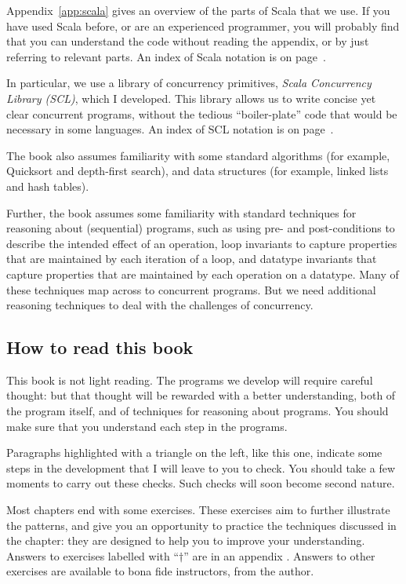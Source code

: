Appendix~\ref{app:scala} gives an overview of the parts of Scala that we use.
If you have used Scala before, or are an experienced programmer, you will
probably find that you can understand the code without reading the appendix,
or by just referring to relevant parts.  An index of Scala notation is on
page~\pageref{scala-index}.

In particular, we  use a library of concurrency primitives, \emph{Scala
  Concurrency Library (SCL)}, which I developed.  This library
allows us to write concise yet clear concurrent programs, without the tedious
``boiler-plate'' code that would be necessary in some languages.
   An index of SCL notation is on
page~\pageref{SCL-index}.

The book also assumes familiarity with some standard algorithms (for example,
Quicksort and depth-first search), and data structures (for example, linked
lists and hash tables).

Further, the book assumes some familiarity with standard techniques for
reasoning about (sequential) programs, such as using pre- and post-conditions
to describe the intended effect of an operation, loop invariants to capture
properties that are maintained by each iteration of a loop, and datatype
invariants that capture properties that are maintained by each operation on a
datatype.  Many of these techniques map across to concurrent programs.  But we
need additional reasoning techniques to deal with the challenges of
concurrency.



\subsection*{How to read this book}

This book is not light reading.  The programs we develop will require careful
thought: but that thought will be rewarded with a better understanding, both
of the program itself, and of techniques for reasoning about programs.  You
should make sure that you understand each step in the programs.
%
\begin{instruction}
Paragraphs highlighted with a triangle on the left, like this one, indicate
some steps in the development that I will leave to you to check.  You should
take a few moments to carry out these checks.  Such checks will soon become
second nature.   
\end{instruction}

Most chapters end with some exercises.  These exercises aim to further
illustrate the patterns, and give you an opportunity to practice the
techniques discussed in the chapter: they are designed to help you to improve
your understanding.  Answers to exercises labelled with ``$\dag$'' are in an
appendix .  Answers to other exercises are available to bona
fide instructors, from the author.

